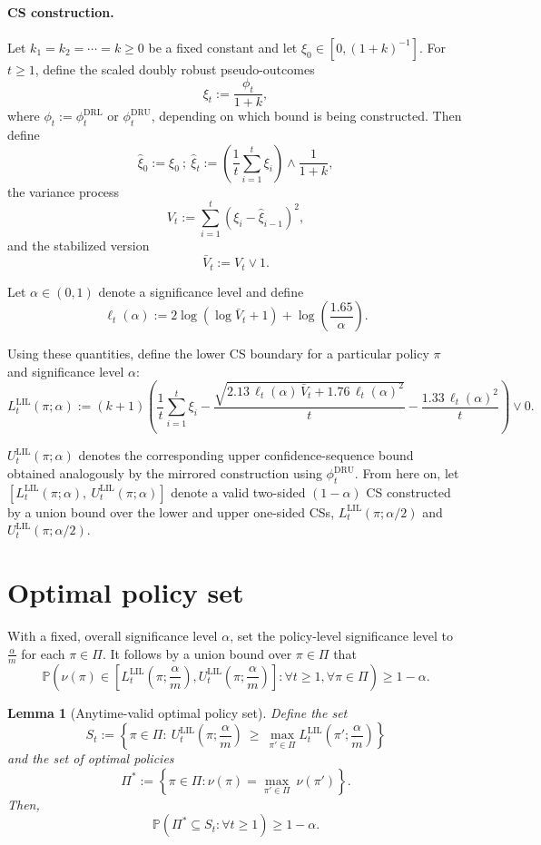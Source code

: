 \documentclass[11pt]{article}
\newcommand{\PP}{\mathbb{P}}
\newcommand{\DRL}{\mathrm{DRL}}
\newcommand{\DRU}{\mathrm{DRU}}
\newcommand{\LIL}{\mathrm{LIL}}
\newtheorem{lemma}{Lemma}
\begin{document}
\paragraph{CS construction.}
Let $k_1=k_2=\cdots = k \ge 0$ be a fixed constant and let $\xi_0 \in [0,(1+k)^{-1}]$. For $t \ge 1$, define the scaled doubly robust pseudo-outcomes
\[
\xi_t := \frac{\phi_t}{1+k},
\]
where $\phi_t := \phi_t^{\DRL}$ or $\phi_t^{\DRU}$, depending on which bound is being constructed. Then define
\[
\hat{\xi}_0 := \xi_0 \ ; \ \hat{\xi}_t := \left(\frac{1}{t}\sum_{i=1}^t \xi_i\right)\wedge \frac{1}{1+k},
\]
the variance process
\[
V_t := \sum_{i=1}^t (\xi_i - \hat{\xi}_{i-1})^2,
\]
and the stabilized version
\[
\bar V_t := V_t \vee 1.
\]

\noindent Let $\alpha \in (0,1)$ denote a significance level and define
\[
\ell_t(\alpha) := 2\log(\log \bar V_t + 1) + \log\left(\frac{1.65}{\alpha}\right).
\]

\noindent Using these quantities, define the lower CS boundary for a particular policy $\pi$ and significance level $\alpha$:
\[
L_t^{\LIL}(\pi; \alpha)
:= (k+1)\left(
\frac{1}{t}\sum_{i=1}^t \xi_i
-
\frac{\sqrt{2.13\,\ell_t(\alpha)\,\bar V_t + 1.76\,\ell_t(\alpha)^2}}{t}
-
\frac{1.33\,\ell_t(\alpha)^2}{t}
\right)\lor 0.
\]

\noindent $U_t^{\LIL}(\pi;\alpha)$ denotes the corresponding upper confidence-sequence bound obtained analogously by the mirrored construction using $\phi_t^{\DRU}$. From here on, let $\left[L_t^{\LIL}(\pi;\alpha), \ U_t^{\LIL}(\pi;\alpha)\right]$ denote a valid two-sided $(1-\alpha)$ CS constructed by a union bound over the lower and upper one-sided CSs, $L_t^{\LIL}(\pi;\alpha/2)$ and $U_t^{\LIL}(\pi;\alpha/2)$.

\section{Optimal policy set}

With a fixed, overall significance level $\alpha$, set the policy-level significance level to $\frac{\alpha}{m}$ for each $\pi\in\Pi$. It follows by a union bound over $\pi \in \Pi$ that 
\begin{equation}
\PP\left(\nu(\pi) \in \left[L_t^\LIL\left(\pi; \frac{\alpha}{m}\right), U_t^\LIL\left(\pi; \frac{\alpha}{m}\right)\right]: \forall t \ge 1, \forall \pi \in \Pi \right) \ge 1 - \alpha.
\label{eq:simultaneous_coverage}
\end{equation}

\begin{lemma}[Anytime-valid optimal policy set]
Define the set
\[
S_t:=\left\{\pi\in\Pi:\ U_t^{\LIL}\left(\pi; \frac{\alpha}{m}\right)\ \ge\ \max_{\pi'\in\Pi} L_t^{\LIL}\left(\pi'; \frac{\alpha}{m}\right)\right\}
\]
and the set of optimal policies
\[
\Pi^* := \left\{\pi \in \Pi : \nu(\pi) = \underset{\pi'\in\Pi}{\max}\ \nu(\pi') \right\}.
\]
Then,
\[
\PP\left(\Pi^* \subseteq S_t : \forall t \ge 1\right) \ge 1 - \alpha.
\]
\end{lemma}
\end{document}
